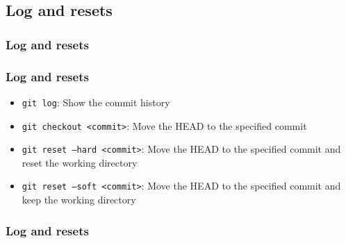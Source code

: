 \documentclass{beamer}
\begin{document}
    \subsection{Log and resets}\label{subsec:log-and-resets}
    \begin{frame}
        \frametitle{Log and resets}
        \begin{figure}[H]
            \centering
            \noindent
        \end{figure}
    \end{frame}
    \begin{frame}
        \frametitle{Log and resets}
        \begin{itemize}
            \item \texttt{git log}: Show the commit history
            \item \texttt{git checkout <commit>}: Move the HEAD to the specified commit
            \item \texttt{git reset --hard <commit>}: Move the HEAD to the specified commit and reset the working directory
            \item \texttt{git reset --soft <commit>}: Move the HEAD to the specified commit and keep the working directory
        \end{itemize}
    \end{frame}
    \begin{frame}
        \frametitle{Log and resets}
        \begin{figure}[H]
            \centering
            \noindent
        \end{figure}
    \end{frame}
\end{document}
